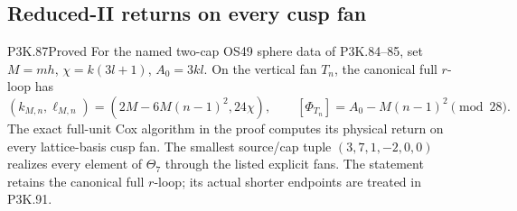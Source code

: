 \subsection{Reduced-II returns on every cusp fan}
\begin{statement}{P3K.87}{Proved}
For the named two-cap OS49 sphere data of P3K.84--85, set \(M=mh\), \(\chi=k(3l+1)\), \(A_0=3kl\). On the vertical fan \(T_n\), the canonical full \(r\)-loop has
\[(k_{M,n},\ell_{M,n})=(2M-6M(n-1)^2,24\chi),\qquad [\Phi_{T_n}]=A_0-M(n-1)^2\pmod {28}.\]
The exact full-unit Cox algorithm in the proof computes its physical return on every lattice-basis cusp fan. The smallest source/cap tuple \((3,7,1,-2,0,0)\) realizes every element of \(\Theta_7\) through the listed explicit fans. The statement retains the canonical full \(r\)-loop; its actual shorter endpoints are treated in P3K.91.
\end{statement}
